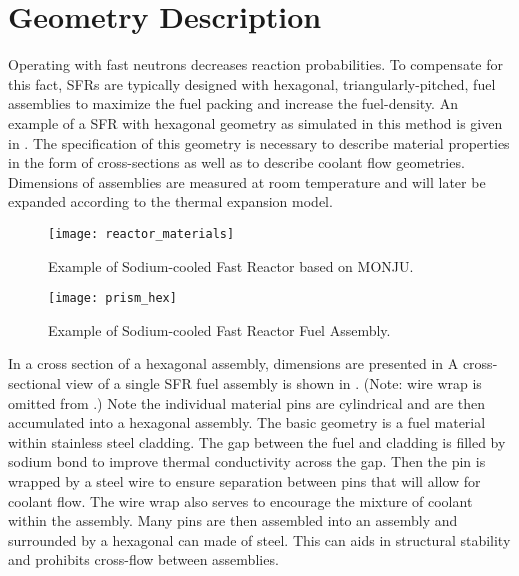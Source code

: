 \section{Geometry Description}
  \label{sec:geometry_description}
  Operating with fast neutrons decreases reaction probabilities. To compensate
  for this fact, SFRs are typically designed with hexagonal,
  triangularly-pitched, fuel assemblies to maximize the fuel packing and
  increase the fuel-density. An example of a SFR with hexagonal geometry as
  simulated in this method is given in .
  The specification of this geometry is necessary to
  describe material properties in the form of cross-sections as well as to
  describe coolant flow geometries. Dimensions of assemblies are measured at
  room temperature and will later be expanded according to the thermal expansion
  model.
  
  \begin{figure}
    \centering
    \texttt{[image: reactor\_materials]}
    \caption{Example of Sodium-cooled Fast Reactor based on MONJU.}
    \label{fig:reactor_materials}
  \end{figure}

  \begin{figure}
    \centering
    \texttt{[image: prism\_hex]}
    \caption{Example of Sodium-cooled Fast Reactor Fuel Assembly.}
    \label{fig:prism_hex}
  \end{figure}

  In a cross section of a hexagonal assembly, dimensions are presented in
  A cross-sectional view of a single SFR fuel assembly is shown in 
  . (Note: wire wrap is omitted from .)
  Note the individual material pins are cylindrical and are then accumulated
  into a hexagonal assembly. The basic geometry is a fuel material within
  stainless steel cladding. The gap between the fuel and cladding is filled by
  sodium bond to improve thermal conductivity across the gap. Then the pin is
  wrapped by a steel wire to ensure separation between pins that will allow for
  coolant flow. The wire wrap also serves to encourage the mixture of coolant
  within the assembly. Many pins are then assembled into an assembly and
  surrounded by a hexagonal can made of steel. This can aids in structural
  stability and prohibits cross-flow between assemblies. 


